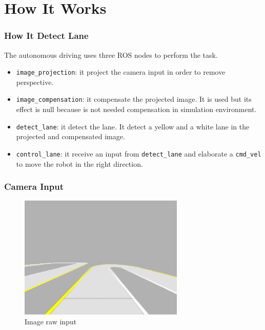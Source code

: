 \section{How It Works}
\begin{frame}
	\frametitle{How It Detect Lane}
	The autonomous driving uses three ROS nodes to perform the task.
	\begin{itemize}
		\item \texttt{image\_projection}: it project the camera input in order to remove perspective.
		\item \texttt{image\_compensation}: it compensate the projected image. It is used but its effect is null because is not needed compensation in simulation environment.
		\item \texttt{detect\_lane}: it detect the lane. It detect a yellow and a white lane in the projected and compensated image.
		\item \texttt{control\_lane}: it receive an input from \texttt{detect\_lane} and elaborate a \texttt{cmd\_vel} to move the robot in the right direction.
	\end{itemize}
\end{frame}

\begin{frame}
	\frametitle{Camera Input}
	\begin{figure}
		\includegraphics[width=0.7\textwidth]{figures/png/imgraw}
		\caption{Image raw input}
	\end{figure}
\end{frame}

